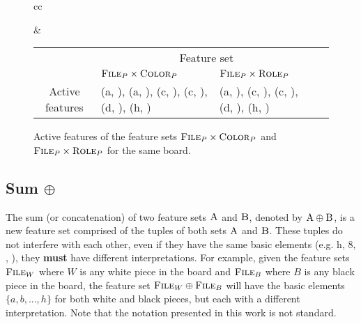 \begin{figure}[H]
\centering

\begin{tabular}{cc}
\raisebox{-7ex}{
\chessboard[
    tinyboard,
    showmover=false,
    hlabel=false,
    setwhite={kc3, nc2, pa2, Pd4},
    addblack={Kc8,bh7, pa7}
]
}

&

\begin{tabular}{|c|p{4cm}|p{4cm}|p{0cm}}
\cline{2-3}
\multicolumn{1}{c|}{} & \multicolumn{2}{c|}{\centering Feature set} \\
\cline{2-3}
\multicolumn{1}{c|}{} & \centering $\textsc{File}_{P} \times \textsc{Color}_{P}$ & \centering $\textsc{File}_{P} \times \textsc{Role}_{P}$ & \\
\cline{1-3}
Active features &
(a, \white), (a, \black), (c, \black), (c, \white), (d, \white), (h, \black) &
(a, \sympawn), (c, \symking), (c, \symknight), (d, \sympawn), (h, \symbishop) \\
\cline{1-3}
\end{tabular}

\end{tabular}

\caption{Active features of the feature sets $\textsc{File}_{P} \times \textsc{Color}_{P}$ and $\textsc{File}_{P} \times \textsc{Role}_{P}$ for the same board.}
\label{fig:active_features}
\end{figure}


\subsection{Sum $\oplus$}


The sum (or concatenation) of two feature sets $\textsc{A}$ and $\textsc{B}$, denoted by $\textsc{A} \oplus \textsc{B}$, is a new feature set comprised of the tuples of both sets $\textsc{A}$ and $\textsc{B}$. These tuples do not interfere with each other, even if they have the same basic elements (e.g. h, 8, \symrook, \black), they \textbf{must} have different interpretations.
For example, given the feature sets $\textsc{File}_{W}$ where $W$ is any white piece in the board and $\textsc{File}_{B}$ where $B$ is any black piece in the board, the feature set $\textsc{File}_{W} \oplus \textsc{File}_{B}$ will have the basic elements $\{a, b, ..., h\}$ for both white and black pieces, but each with a different interpretation. Note that the notation presented in this work is not standard.

